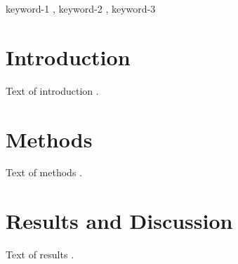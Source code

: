 \begin{abstract}
In this work we demonstrate the formation of a new type of polariton on the interface between a cuprous oxide slab and a polystyrene micro-sphere placed on the slab. The evanescent field of the resonant whispering gallery mode effectively couples with the quadrupole excitons in cuprous oxide. This evanescent polariton has a long life-time, which is determined only by its excitonic component.
\end{abstract}

\begin{keywords}
keyword-1 \sep
keyword-2 \sep
keyword-3
\end{keywords}

\maketitle

\section{Introduction}

Text of introduction \cite{Fortunato2010}.

\section{Methods}

Text of methods \cite{NewmanGirvan2004}.

\section{Results and Discussion}

Text of results \cite{Vehlowetal2013}.




